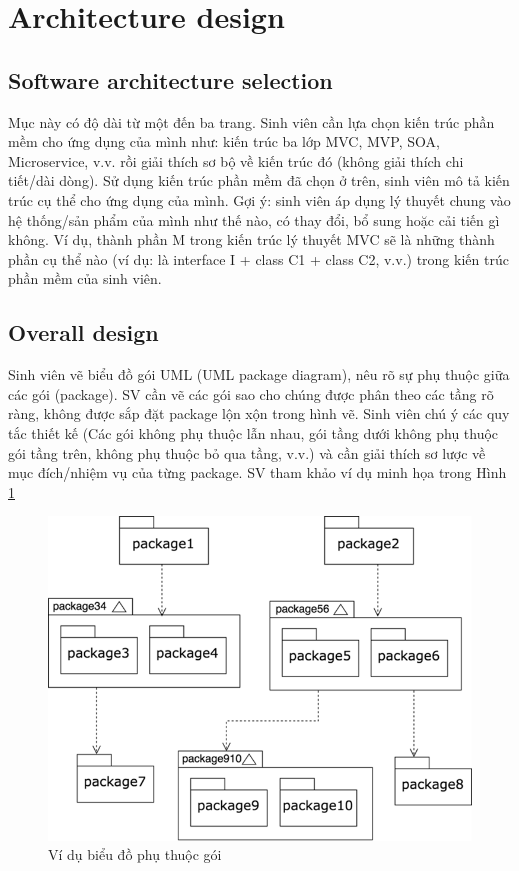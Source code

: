 \documentclass[../main.tex]{subfiles}
\begin{document}
\section{Architecture design}
\subsection{Software architecture selection}
Mục này có độ dài từ một đến ba trang. Sinh viên cần lựa chọn kiến trúc phần mềm cho ứng dụng của mình như: kiến trúc ba lớp MVC, MVP, SOA, Microservice, v.v. rồi giải thích sơ bộ về kiến trúc đó (không giải thích chi tiết/dài dòng).
Sử dụng kiến trúc phần mềm đã chọn ở trên, sinh viên mô tả kiến trúc cụ thể cho ứng dụng của mình. Gợi ý: sinh viên áp dụng lý thuyết chung vào hệ thống/sản phẩm của mình như thế nào, có thay đổi, bổ sung hoặc cải tiến gì không. Ví dụ, thành phần M trong kiến trúc lý thuyết MVC sẽ là những thành phần cụ thể nào (ví dụ: là interface I + class C1 + class C2, v.v.) trong kiến trúc phần mềm của sinh viên.

\subsection{Overall design}
Sinh viên vẽ biểu đồ gói UML (UML package diagram), nêu rõ sự phụ thuộc giữa các gói (package). SV cần vẽ các gói sao cho chúng được phân theo các tầng rõ ràng, không được sắp đặt package lộn xộn trong hình vẽ. Sinh viên chú ý các quy tắc thiết kế (Các gói không phụ thuộc lẫn nhau, gói tầng dưới không phụ thuộc gói tầng trên, không phụ thuộc bỏ qua tầng, v.v.) và cần giải thích sơ lược về mục đích/nhiệm vụ của từng package. SV tham khảo ví dụ minh họa trong Hình \ref{fig:Fig1}
\begin{figure}[H]
    \centering
    \includegraphics{Figure/Picture1.png}
    \caption{Ví dụ biểu đồ phụ thuộc gói}
    \label{fig:Fig1}
\end{figure}
\end{document}
